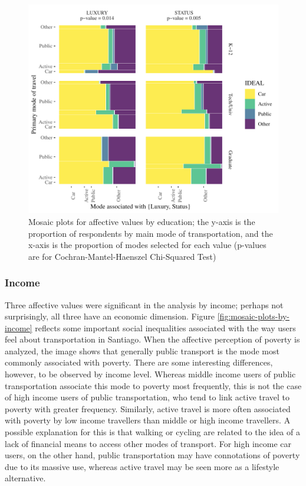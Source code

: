 \documentclass[]{elsarticle} %
\makeatletter
\def\maxwidth{\ifdim\Gin@nat@width>\linewidth\linewidth
\else\Gin@nat@width\fi}
\let\Oldincludegraphics\includegraphics
\renewcommand{\includegraphics}[1]{\Oldincludegraphics[width=\maxwidth]{#1}}
\makeatother
\begin{document}
\begin{figure}
\centering
\includegraphics{Dissonance_Santiago_v1_files/figure-latex/figure-mosaic-plots-by-attribute-and-education-1.pdf}
\caption{\label{fig:mosaic-plots-by-education}Mosaic plots for affective
values by education; the y-axis is the proportion of respondents by main
mode of transportation, and the x-axis is the proportion of modes
selected for each value (p-values are for Cochran-Mantel-Haenszel
Chi-Squared Test)}
\end{figure}

\hypertarget{income-1}{%
\subsubsection{Income}\label{income-1}}

Three affective values were significant in the analysis by income;
perhaps not surprisingly, all three have an economic dimension. Figure
\ref{fig:mosaic-plots-by-income} reflects some important social
inequalities associated with the way users feel about transportation in
Santiago. When the affective perception of poverty is analyzed, the
image shows that generally public transport is the mode most commonly
associated with poverty. There are some interesting differences,
however, to be observed by income level. Whereas middle income users of
public transportation associate this mode to poverty most frequently,
this is not the case of high income users of public transportation, who
tend to link active travel to poverty with greater frequency. Similarly,
active travel is more often associated with poverty by low income
travellers than middle or high income travellers. A possible explanation
for this is that walking or cycling are related to the idea of a lack of
financial means to access other modes of transport. For high income car
users, on the other hand, public transportation may have connotations of
poverty due to its massive use, whereas active travel may be seen more
as a lifestyle alternative.
\end{document}
